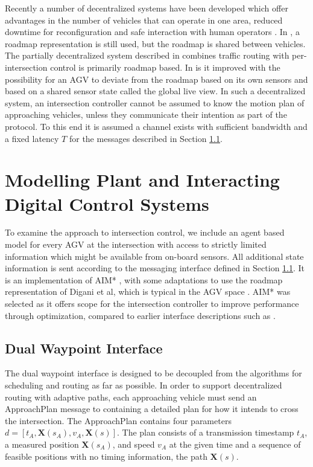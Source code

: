Recently a number of decentralized systems have been developed which offer advantages in the number of vehicles that can operate in one area, reduced downtime for reconfiguration and safe interaction with human operators \cite{Fragapane2021} . In \cite{Walenta2017}, a roadmap representation is still used, but the roadmap is shared between vehicles. The partially decentralized system described in \cite{Digani2014coord} combines traffic routing with per-intersection control is primarily roadmap based. In \cite{Cardarelli2017} is it improved with the possibility for an AGV to deviate from the roadmap based on its own sensors and based on a shared sensor state called the global live view. In such a decentralized system, an intersection controller cannot be assumed to know the motion plan of approaching vehicles, unless they communicate their intention as part of the protocol. To this end it is assumed a channel exists with sufficient bandwidth and a fixed latency $T$ for the messages described in Section \ref{sec:dual_waypoint}.

\section{Modelling Plant and Interacting Digital Control Systems}
To examine the approach to intersection control, we include an agent based model for every AGV at the intersection with access to strictly limited information which might be available from on-board sensors. All additional state information is sent according to the messaging interface defined in Section \ref{sec:dual_waypoint}. It is an implementation of AIM* \cite{Levin2017}, with some adaptations to use the roadmap representation of Digani et al, which is typical in the AGV space \cite{Digani2019}. AIM* was selected as it offers scope for the intersection controller to improve performance through optimization, compared to earlier interface descriptions such as \cite{Dresner2004}.  
\subsection{Dual Waypoint Interface}
\label{sec:dual_waypoint}
The dual waypoint interface is designed to be decoupled from the algorithms for scheduling and routing as far as possible. In order to support decentralized routing with adaptive paths, each approaching vehicle must send an ApproachPlan message to containing a detailed plan for how it intends to cross the intersection.  The ApproachPlan contains four parameters $d =\left[ t_A, \bm{X}( s_A ), v_A, \bm{X}(s) \right]$. The plan consists of a transmission timestamp $t_A$, a measured position $\bm{X}(s_A)$, and speed $v_A$ at the given time and a sequence of feasible positions with no timing information, the path $\bm{X}(s)$. 

